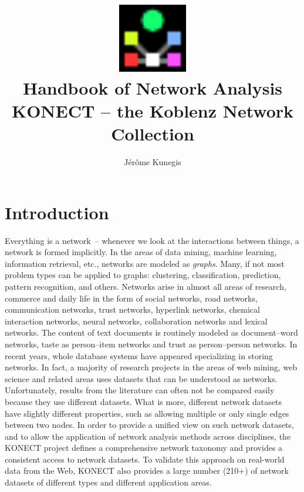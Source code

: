 \documentclass{article}
\begin{document}
\title{
  \includegraphics[width=3cm]{konect-logo} \\
  \vspace{1cm}
  {\Huge Handbook of Network Analysis} \\
  KONECT -- the Koblenz Network Collection 
}

\author{Jérôme Kunegis}

\maketitle

\section{Introduction}
Everything is a network~-- whenever we look at the interactions between
things, a network is formed implicitly.  In the areas of data mining,
machine learning, information retrieval, etc., networks are modeled
as \emph{graphs}.  Many, if not most problem types can be applied to
graphs: clustering, classification, prediction, pattern recognition, and
others.  Networks arise in almost all areas of research, commerce and
daily life in the form of social networks, road networks, communication
networks, trust networks, hyperlink networks, chemical interaction
networks, neural networks, collaboration networks and lexical networks.
The content of text documents is routinely modeled as document--word
networks, taste as person--item networks and trust as person--person
networks.  In recent years, whole database systems have appeared
specializing in storing networks.  In fact, a majority of research
projects in the areas of web mining, web science and related areas uses
datasets that can be understood as networks.  Unfortunately, results
from the literature can often not be compared easily because
they use different datasets. What is more, different network datasets
have slightly different properties, such as allowing multiple or only
single edges between two nodes.  In order to provide a unified view on
such network datasets, and to allow the application of network analysis
methods across disciplines, the KONECT project defines a comprehensive
network taxonomy and provides a consistent access to network datasets.
To validate this approach on real-world data from the Web, KONECT
also provides a large number (210+) of network datasets of different
types and different application areas. 
\end{document}
